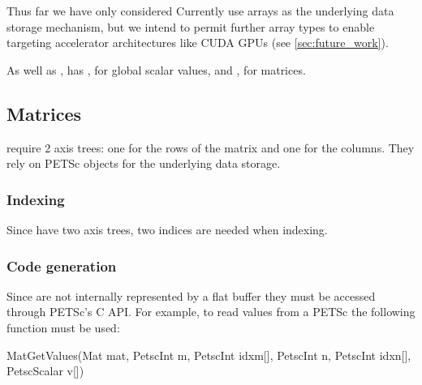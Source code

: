 \documentclass[thesis]{subfiles}
\begin{document}
Thus far we have only considered
Currently  use \numpy arrays as the underlying data storage mechanism, but we intend to permit further array types to enable targeting accelerator architectures like CUDA GPUs (see \cref{sec:future_work}).

As well as ,  has , for global scalar values, and , for matrices.


\subsection{Matrices}
\label{sec:impl_matrices}


 require 2 axis trees: one for the rows of the matrix and one for the columns.
They rely on PETSc  objects for the underlying data storage.

\subsubsection{Indexing}

Since  have two axis trees, two indices are needed when indexing.


\subsubsection{Code generation}

Since  are not internally represented by a flat buffer they must be accessed through PETSc's C API.
For example, to read values from a PETSc  the following function must be used:

\begin{cinline}
  MatGetValues(Mat mat,
               PetscInt m, PetscInt idxm[],
               PetscInt n, PetscInt idxn[],
               PetscScalar v[])
\end{cinline}
\end{document}
